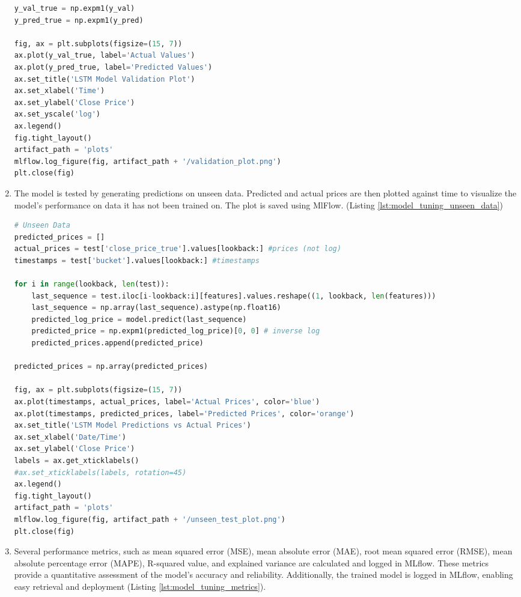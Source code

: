 \begin{enumerate}
\begin{lstlisting}[language=python, caption={Model Tuning Traning and Validation}, label={lst:model_tuning_training_validation}]
y_val_true = np.expm1(y_val)
y_pred_true = np.expm1(y_pred)

fig, ax = plt.subplots(figsize=(15, 7))
ax.plot(y_val_true, label='Actual Values')
ax.plot(y_pred_true, label='Predicted Values')
ax.set_title('LSTM Model Validation Plot')
ax.set_xlabel('Time')
ax.set_ylabel('Close Price')
ax.set_yscale('log')
ax.legend()
fig.tight_layout()
artifact_path = 'plots'
mlflow.log_figure(fig, artifact_path + '/validation_plot.png')
plt.close(fig)
\end{lstlisting}

\item The model is tested by generating predictions on unseen data. Predicted and actual prices are then plotted against time to visualize the model's performance on data it has not been trained on. The plot is saved using MlFlow. (Listing \ref{lst:model_tuning_unseen_data})

\begin{lstlisting}[language=python, caption={Model Tuning Unseen Data}, label={lst:model_tuning_unseen_data}]
# Unseen Data
predicted_prices = []
actual_prices = test['close_price_true'].values[lookback:] #prices (not log) 
timestamps = test['bucket'].values[lookback:] #timestamps

for i in range(lookback, len(test)):
    last_sequence = test.iloc[i-lookback:i][features].values.reshape((1, lookback, len(features)))
    last_sequence = np.array(last_sequence).astype(np.float16)
    predicted_log_price = model.predict(last_sequence)
    predicted_price = np.expm1(predicted_log_price)[0, 0] # inverse log
    predicted_prices.append(predicted_price)
    
predicted_prices = np.array(predicted_prices)

fig, ax = plt.subplots(figsize=(15, 7))
ax.plot(timestamps, actual_prices, label='Actual Prices', color='blue')
ax.plot(timestamps, predicted_prices, label='Predicted Prices', color='orange')
ax.set_title('LSTM Model Predictions vs Actual Prices')
ax.set_xlabel('Date/Time')
ax.set_ylabel('Close Price')
labels = ax.get_xticklabels()
#ax.set_xticklabels(labels, rotation=45)
ax.legend()
fig.tight_layout()
artifact_path = 'plots'
mlflow.log_figure(fig, artifact_path + '/unseen_test_plot.png')
plt.close(fig)
\end{lstlisting}


\item Several performance metrics, such as mean squared error (MSE), mean absolute error (MAE), root mean squared error (RMSE), mean absolute percentage error (MAPE), R-squared value, and explained variance are calculated and logged in MLflow. These metrics provide a quantitative assessment of the model’s accuracy and reliability. Additionally, the trained model is logged in MLflow, enabling easy retrieval and deployment (Listing \ref{lst:model_tuning_metrics}).


\end{enumerate}
